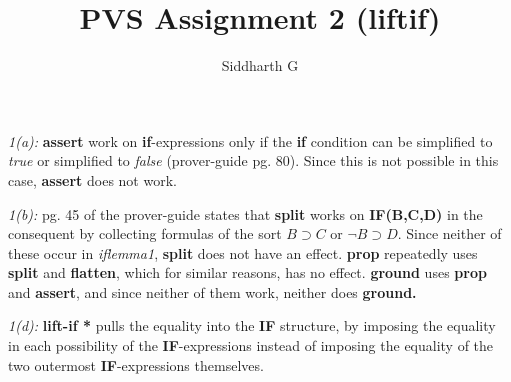 \documentclass[a4paper]{article}
\title{PVS Assignment 2 (liftif)}
\author{Siddharth G}
\date{\vspace{-5ex}}
\begin{document}
\maketitle

\itemize

\item \emph{1(a):} \textbf{assert} work on \textbf{if}-expressions only if the \textbf{if} condition can be simplified to \textit{true} or simplified to \textit{false} (prover-guide pg. 80). Since this is not possible in this case, \textbf{assert} does not work.

\item \emph{1(b):} pg. 45 of the prover-guide states that \textbf{split} works on \textbf{IF(B,C,D)} in the consequent by collecting formulas of the sort $ B \supset C$ or $\neg B \supset D$. Since neither of these occur in \textit{iflemma1}, \textbf{split} does not have an effect. \textbf{prop} repeatedly uses \textbf{split} and \textbf{flatten}, which for similar reasons, has no effect. \textbf{ground} uses \textbf{prop} and \textbf{assert}, and since neither of them work, neither does \textbf{ground.}

\item \emph{1(d):} \textbf{lift-if *} pulls the equality into the \textbf{IF} structure, by imposing the equality in each possibility of the \textbf{IF}-expressions instead of imposing the equality of the two outermost \textbf{IF}-expressions themselves. 
	
\end{document}

